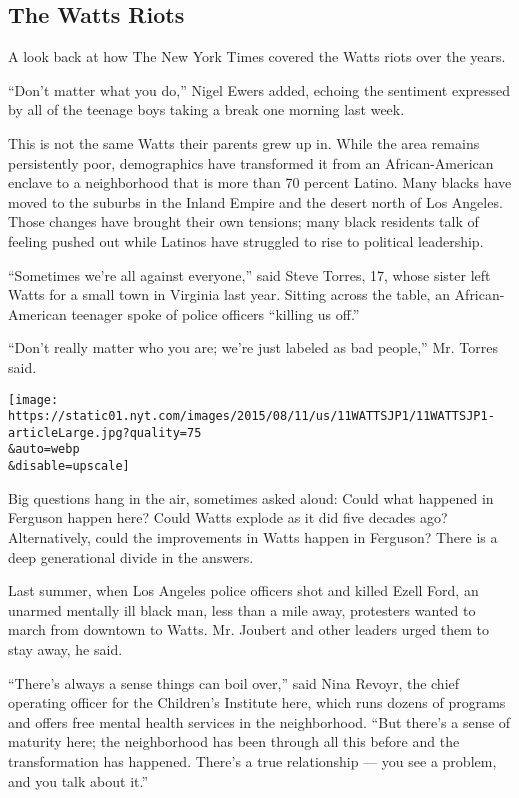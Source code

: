\hypertarget{the-watts-riots}{%
\subsection{The Watts Riots}\label{the-watts-riots}}

A look back at how The New York Times covered the Watts riots over the
years.

``Don't matter what you do,'' Nigel Ewers added, echoing the sentiment
expressed by all of the teenage boys taking a break one morning last
week.

This is not the same Watts their parents grew up in. While the area
remains persistently poor, demographics have transformed it from an
African-American enclave to a neighborhood that is more than 70 percent
Latino. Many blacks have moved to the suburbs in the Inland Empire and
the desert north of Los Angeles. Those changes have brought their own
tensions; many black residents talk of feeling pushed out while Latinos
have struggled to rise to political leadership.

``Sometimes we're all against everyone,'' said Steve Torres, 17, whose
sister left Watts for a small town in Virginia last year. Sitting across
the table, an African-American teenager spoke of police officers
``killing us off.''

``Don't really matter who you are; we're just labeled as bad people,''
Mr. Torres said.

\texttt{[image: https://static01.nyt.com/images/2015/08/11/us/11WATTSJP1/11WATTSJP1-articleLarge.jpg?quality=75\\\&auto=webp\\\&disable=upscale]}

Big questions hang in the air, sometimes asked aloud: Could what
happened in Ferguson happen here? Could Watts explode as it did five
decades ago? Alternatively, could the improvements in Watts happen in
Ferguson? There is a deep generational divide in the answers.

Last summer, when Los Angeles police officers shot and killed Ezell
Ford, an unarmed mentally ill black man, less than a mile away,
protesters wanted to march from downtown to Watts. Mr. Joubert and other
leaders urged them to stay away, he said.

``There's always a sense things can boil over,'' said Nina Revoyr, the
chief operating officer for the Children's Institute here, which runs
dozens of programs and offers free mental health services in the
neighborhood. ``But there's a sense of maturity here; the neighborhood
has been through all this before and the transformation has happened.
There's a true relationship --- you see a problem, and you talk about
it.''

